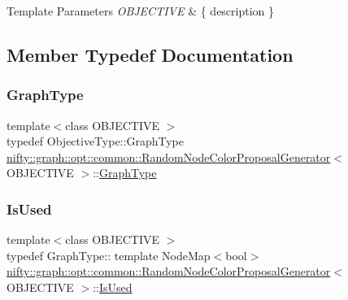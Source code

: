 \begin{DoxyTemplParams}{Template Parameters}
{\em O\+B\+J\+E\+C\+T\+I\+VE} & \{ description \} \\
\hline
\end{DoxyTemplParams}


\subsection{Member Typedef Documentation}
\mbox{\label{classnifty_1_1graph_1_1opt_1_1common_1_1RandomNodeColorProposalGenerator_a39d7fdcca43df0ce3e53a415391670b6}} 
\subsubsection{\texorpdfstring{Graph\+Type}{GraphType}}
{\footnotesize\ttfamily template$<$class O\+B\+J\+E\+C\+T\+I\+VE $>$ \\
typedef Objective\+Type\+::\+Graph\+Type \hyperlink{classnifty_1_1graph_1_1opt_1_1common_1_1RandomNodeColorProposalGenerator}{nifty\+::graph\+::opt\+::common\+::\+Random\+Node\+Color\+Proposal\+Generator}$<$ O\+B\+J\+E\+C\+T\+I\+VE $>$\+::\hyperlink{classnifty_1_1graph_1_1opt_1_1common_1_1RandomNodeColorProposalGenerator_a39d7fdcca43df0ce3e53a415391670b6}{Graph\+Type}}

\mbox{\label{classnifty_1_1graph_1_1opt_1_1common_1_1RandomNodeColorProposalGenerator_a252ead89e3354056605c75b9da12de53}} 
\subsubsection{\texorpdfstring{Is\+Used}{IsUsed}}
{\footnotesize\ttfamily template$<$class O\+B\+J\+E\+C\+T\+I\+VE $>$ \\
typedef Graph\+Type\+:: template Node\+Map$<$bool$>$ \hyperlink{classnifty_1_1graph_1_1opt_1_1common_1_1RandomNodeColorProposalGenerator}{nifty\+::graph\+::opt\+::common\+::\+Random\+Node\+Color\+Proposal\+Generator}$<$ O\+B\+J\+E\+C\+T\+I\+VE $>$\+::\hyperlink{classnifty_1_1graph_1_1opt_1_1common_1_1RandomNodeColorProposalGenerator_a252ead89e3354056605c75b9da12de53}{Is\+Used}}

